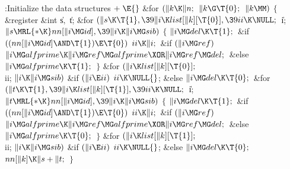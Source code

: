 \Y\B\4:Initialize the data structures\X${}\mathrel+\E{}$\6
\&{for} ${}(\|k\K\|n;{}$ ${}\|k\G\T{0};{}$ ${}\|k\MM){}$\5
${}\{{}$\1\6
\&{register} \&{int} \|s${},{}$ \|t;\7
\&{for} ${}(\|s\K\T{1},\39\|i\K\\{list}[\|k][\T{0}],\39\\{ii}\K\NULL;{}$ \|i;
${}\|s\MRL{*{\K}}\\{nn}[\|i\MG\\{id}],\39\|i\K\|i\MG\\{sib}){}$\5
${}\{{}$\1\6
${}\|i\MG\\{del}\K\T{1};{}$\6
\&{if} ${}((\\{nn}[\|i\MG\\{id}]\AND\T{1})\E\T{0}){}$\1\5
${}\\{ii}\K\|i;{}$\2\6
\&{if} ${}(\|i\MG\\{ref}){}$\1\5
${}\|i\MG\\{alfprime}\K\|i\MG\\{ref}\MG\\{alfprime}\XOR\|i\MG\\{ref}\MG%
\\{del};{}$\2\6
\&{else}\1\5
${}\|i\MG\\{alfprime}\K\T{1};{}$\2\6
\4${}\}{}$\2\6
\&{for} ${}(\|i\K\\{list}[\|k][\T{0}];{}$ \\{ii}; ${}\|i\K\|i\MG\\{sib}){}$\1\6
\&{if} ${}(\|i\E\\{ii}){}$\1\5
${}\\{ii}\K\NULL{}$;\5
\2\&{else}\1\5
${}\|i\MG\\{del}\K\T{0};{}$\2\2\6
\&{for} ${}(\|t\K\T{1},\39\|i\K\\{list}[\|k][\T{1}],\39\\{ii}\K\NULL;{}$ \|i;
${}\|t\MRL{*{\K}}\\{nn}[\|i\MG\\{id}],\39\|i\K\|i\MG\\{sib}){}$\5
${}\{{}$\1\6
${}\|i\MG\\{del}\K\T{1};{}$\6
\&{if} ${}((\\{nn}[\|i\MG\\{id}]\AND\T{1})\E\T{0}){}$\1\5
${}\\{ii}\K\|i;{}$\2\6
\&{if} ${}(\|i\MG\\{ref}){}$\1\5
${}\|i\MG\\{alfprime}\K\|i\MG\\{ref}\MG\\{alfprime}\XOR\|i\MG\\{ref}\MG%
\\{del};{}$\2\6
\&{else}\1\5
${}\|i\MG\\{alfprime}\K\T{0};{}$\2\6
\4${}\}{}$\2\6
\&{for} ${}(\|i\K\\{list}[\|k][\T{1}];{}$ \\{ii}; ${}\|i\K\|i\MG\\{sib}){}$\1\6
\&{if} ${}(\|i\E\\{ii}){}$\1\5
${}\\{ii}\K\NULL{}$;\5
\2\&{else}\1\5
${}\|i\MG\\{del}\K\T{0};{}$\2\2\6
${}\\{nn}[\|k]\K\|s+\|t;{}$\6
\4${}\}{}$\2\par
\fi


